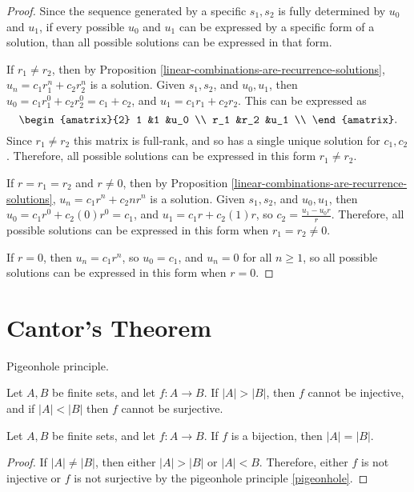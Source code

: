 \begin{proof}
    Since the sequence generated by a specific $s_1, s_2$ is fully determined by $u_0$ and $u_1$, if every possible $u_0$ and $u_1$ can be expressed by a specific form of a solution, than all possible solutions can be expressed in that form.

    If $r_1 \neq r_2$, then by Proposition \ref{linear-combinations-are-recurrence-solutions}, $u_n = c_1r_1^n + c_2r_2^n$ is a solution. Given $s_1, s_2$, and $u_0, u_1$, then $u_0 = c_1r_1^0 + c_2r_2^0 = c_1 + c_2$, and $u_1 = c_1r_1 + c_2r_2$. This can be expressed as
    \[\begin{amatrix}{2}
        1 &1 &u_0 \\
        r_1 &r_2 &u_1 \\
    \end{amatrix}.\] Since $r_1 \neq r_2$ this matrix is full-rank, and so has a single unique solution for $c_1, c_2$. Therefore, all possible solutions can be expressed in this form $r_1 \neq r_2$.

    If $r = r_1 = r_2$ and $r \neq 0$, then by Proposition \ref{linear-combinations-are-recurrence-solutions}, $u_n = c_1r^n + c_2nr^n$ is a solution. Given $s_1, s_2$, and $u_0, u_1$, then $u_0 = c_1r^0 + c_2(0)r^0 = c_1$, and $u_1 = c_1r + c_2(1)r$, so $c_2 = \frac{u_1 - u_0r}{r}$. Therefore, all possible solutions can be expressed in this form when $r_1 = r_2 \neq 0$.

    If $r = 0$, then $u_n = c_1r^n$, so $u_0 = c_1$, and $u_n = 0$ for all $n \geq 1$, so all possible solutions can be expressed in this form when $r = 0$.
\end{proof}

\section{Cantor's Theorem}

\begin{thm}\label{pigeonhole}
    Pigeonhole principle.

    Let $A, B$ be finite sets, and let $f: A \to B$. If $|A| > |B|$, then $f$ cannot be injective, and if $|A| < |B|$ then $f$ cannot be surjective.
\end{thm}

\begin{prop}
    Let $A, B$ be finite sets, and let $f: A \to B$. If $f$ is a bijection, then $|A| = |B|$.
\end{prop}

\begin{proof}
    If $|A| \neq |B|$, then either $|A| > |B|$ or $|A| < B$. Therefore, either $f$ is not injective or $f$ is not surjective by the pigeonhole principle \ref{pigeonhole}.
\end{proof}

